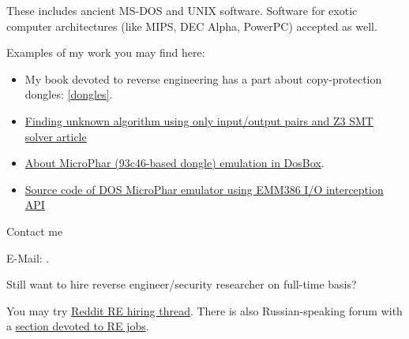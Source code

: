 These includes ancient MS-DOS and UNIX software. Software for exotic computer architectures (like MIPS, DEC Alpha, PowerPC) accepted as well.

Examples of my work you may find here:

\begin{itemize}
\item My book devoted to reverse engineering has a part about copy-protection dongles: \ref{dongles}.
\item \href{http://yurichev.com/writings/z3_rockey.pdf}{Finding unknown algorithm using only input/output pairs and Z3 SMT solver article}
\item \href{http://yurichev.com/blog/56/}{About MicroPhar (93c46-based dongle) emulation in DosBox}.
\item \href{http://conus.info/dongle/src/microph.asm}{Source code of DOS MicroPhar emulator using EMM386 I/O interception API}
\end{itemize}

\large Contact me \normalsize

E-Mail: \GTT{\EMAIL}.

\large Still want to hire reverse engineer/security researcher on full-time basis? \normalsize

You may try \href{https://www.reddit.com/r/ReverseEngineering/comments/49cza0/rreverseengineerings_2015_triannual_hiring_thread/}{Reddit RE hiring thread}.
There is also Russian-speaking forum with a \href{https://forum.reverse4you.org/forumdisplay.php?f=252}{section devoted to RE jobs}.

\fi %

\vspace*{\fill}
\vfill
